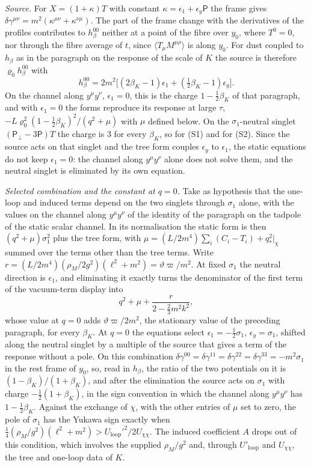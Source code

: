 \emph{Source.} For \(X=(1+\kappa)T\) with constant \(\kappa=\epsilon_1+\epsilon_y\mathsf P\) the frame gives \(\delta\gamma^{\mu\nu}=m^2(\kappa^{\mu\nu}+\kappa^{\nu\mu})\). The part of the frame change with the derivatives of the profiles contributes to \(h_\beta^{00}\) neither at a point of the fibre over \(y_0\), where \(T^0=0\), nor through the fibre average of \(t\), since \(\langle T_\mu M^{\mu\rho}\rangle\) is along \(y_0\). For dust coupled to \(h_\beta\) as in the paragraph on the response of the scale of \(K\) the source is therefore \(\varrho_0h_\beta^{00}\) with
\[
h_\beta^{00}=2m^2\bigl[(2\beta_K-1)\epsilon_1+(\tfrac12\beta_K-1)\epsilon_y\bigr].
\]
On the channel along \(y^\mu y^\nu\), \(\epsilon_1=0\), this is the charge \(1-\tfrac12\beta_K\) of that paragraph, and with \(\epsilon_1=0\) the forms reproduce its response at large \(\tau\), \(-L\varrho_0^2(1-\tfrac12\beta_K)^2/(q^2+\mu)\) with \(\mu\) defined below. On the \(\sigma_1\)-neutral singlet \((\mathsf P_\perp-3\mathsf P)T\) the charge is \(3\) for every \(\beta_K\), so for (S1) and for (S2). Since the source acts on that singlet and the tree form couples \(\epsilon_y\) to \(\epsilon_1\), the static equations do not keep \(\epsilon_1=0\): the channel along \(y^\mu y^\nu\) alone does not solve them, and the neutral singlet is eliminated by its own equation.

\emph{Selected combination and the constant at \(q=0\).} Take as hypothesis that the one-loop and induced terms depend on the two singlets through \(\sigma_1\) alone, with the values on the channel along \(y^\mu y^\nu\) of the identity of the paragraph on the tadpole of the static scalar channel. In its normalisation the static form is then \((q^2+\mu)\sigma_1^2\) plus the tree form, with \(\mu=(L/2m^4)\sum_i(C_i-T_i)+q_*^2|_\chi\) summed over the terms other than the tree terms. Write \(r=(L/2m^4)(\rho_M/2g^2)(\ell^2+m^2)=\vartheta\varpi/m^2\). At fixed \(\sigma_1\) the neutral direction is \(\epsilon_1\), and eliminating it exactly turns the denominator of the first term of the vacuum-term display into
\[
q^2+\mu+\frac{r}{2-\tfrac23m^2k^2},
\]
whose value at \(q=0\) adds \(\vartheta\varpi/2m^2\), the stationary value of the preceding paragraph, for every \(\beta_K\). At \(q=0\) the equations select \(\epsilon_1=-\tfrac12\sigma_1\), \(\epsilon_y=\sigma_1\), shifted along the neutral singlet by a multiple of the source that gives a term of the response without a pole. On this combination \(\delta\gamma^{00}=\delta\gamma^{11}=\delta\gamma^{22}=\delta\gamma^{33}=-m^2\sigma_1\) in the rest frame of \(y_0\), so, read in \(h_\beta\), the ratio of the two potentials on it is \((1-\beta_K)/(1+\beta_K)\), and after the elimination the source acts on \(\sigma_1\) with charge \(-\tfrac12(1+\beta_K)\), in the sign convention in which the channel along \(y^\mu y^\nu\) has \(1-\tfrac12\beta_K\). Against the exchange of \(\chi\), with the other entries of \(\mu\) set to zero, the pole of \(\sigma_1\) has the Yukawa sign exactly when \(\tfrac14(\rho_M/g^2)(\ell^2+m^2)>U_{\mathrm{loop}}'^2/2U_{\chi\chi}\). The induced coefficient \(A\) drops out of this condition, which involves the supplied \(\rho_M/g^2\) and, through \(U'_{\mathrm{loop}}\) and \(U_{\chi\chi}\), the tree and one-loop data of \(K\).


